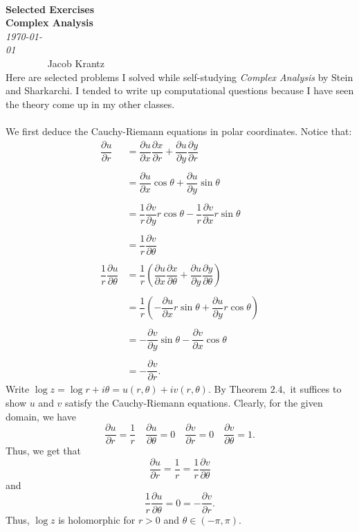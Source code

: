 \documentclass[12pt]{article}
\newenvironment{statement}[1]{\smallskip\noindent\color{black}{\bf #1.}}{}
\theoremstyle{definition}
\theoremstyle{remark}
\newcommand{\p}{\partial}
\begin{document}
{\noindent\Huge\bf  \\[0.5\baselineskip] {\selectfont  Selected Exercises}         }\\[1\baselineskip] %
{ {\bf {}\selectfont Complex Analysis}\\ {\textit{\selectfont     \today}}}~~~~~~~~~~~~~~~~~~~~~~~~~~~~~~~~~~~~~~~~~~~~~~~~~~~~~~~~~~~~~~~~~~~~~~~~~~~~~    {\large{Jacob Krantz}}
\noindent\makebox[\linewidth]{\rule{8in}{0.4pt}}
\\[1.4\baselineskip]
Here are selected problems I solved while self-studying \textit{Complex Analysis} by Stein and Sharkarchi. I tended to write up computational questions because I have seen the theory come up in my other classes. \\\\
\begin{statement}{1.9}
We first deduce the Cauchy-Riemann equations in polar coordinates. Notice that:
\begin{align*}
\dfrac{\p u}{\p r} &= \dfrac{\p u}{\p x}\dfrac{\p x}{\p r} + \dfrac{\p u}{\p y}\dfrac{\p y}{\p r} \\\\
&= \dfrac{\p u}{\p x}\cos\theta + \dfrac{\p u}{\p y}\sin\theta \\\\
&= \dfrac{1}{r}\dfrac{\p v}{\p y}r\cos\theta - \dfrac{1}{r}\dfrac{\p v}{\p x}r\sin\theta \\\\
&= \dfrac{1}{r}\dfrac{\p v}{\p \theta} \\\\
\dfrac{1}{r}\dfrac{\p u}{\p \theta} &= \dfrac{1}{r}\left (\dfrac{\p u}{\p x}\dfrac{\p x}{\p \theta} + \dfrac{\p u}{\p y}\dfrac{\p y}{\p \theta}\right ) \\\\
&= \dfrac{1}{r}\left (-\dfrac{\p u}{\p x}r\sin\theta + \dfrac{\p u}{\p y}r\cos\theta\right ) \\\\
&= -\dfrac{\p v}{\p y}\sin\theta - \dfrac{\p v}{\p x}\cos\theta \\\\
&= -\dfrac{\p v}{\p r}.
\end{align*}
Write $\log z = \log r + i\theta = u(r,\theta) + iv(r,\theta).$ By Theorem $2.4,$ it suffices to show $u$ and $v$ satisfy the Cauchy-Riemann equations. Clearly, for the given domain, we have
\[\dfrac{\p u}{\p r} = \dfrac{1}{r} \quad \dfrac{\p u}{\p \theta} = 0 \quad \dfrac{\p v}{\p r} = 0 \quad \dfrac{\p v}{\p \theta} = 1.\]
Thus, we get that
\[\dfrac{\p u}{\p r} = \dfrac{1}{r} = \dfrac{1}{r}\dfrac{\p v}{\p \theta}\]
and
\[\dfrac{1}{r}\dfrac{\p u}{\p \theta} = 0 = -\dfrac{\p v}{\p r}.\]
Thus, $\log z$ is holomorphic for $r > 0$ and $\theta \in (-\pi,\pi).$
\end{statement}
\end{document}
